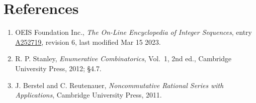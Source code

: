 \documentclass[11pt]{article}
\theoremstyle{definition}
\begin{document}
\section{References}

\begin{enumerate}

\item OEIS Foundation Inc., \emph{The On-Line Encyclopedia of Integer Sequences}, entry \href{https://oeis.org/A252719}{A252719}, revision 6, last modified Mar 15 2023.

\item R. P. Stanley, \emph{Enumerative Combinatorics}, Vol.~1, 2nd ed., Cambridge University Press, 2012; \S4.7.

\item J. Berstel and C. Reutenauer, \emph{Noncommutative Rational Series with Applications}, Cambridge University Press, 2011.

\end{enumerate}
\end{document}
